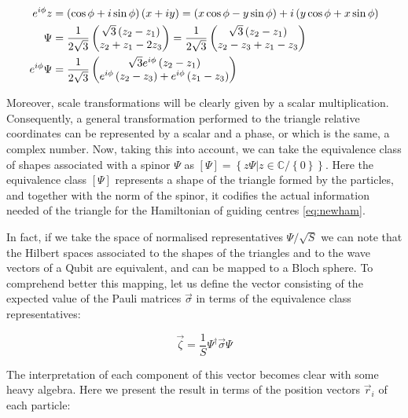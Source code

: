 \begin{align*}
e^{i\phi}z &= \left( \cos{\phi}+i\sin{\phi} \right)\left( x+iy \right) = \left( x\cos{\phi}-y\sin{\phi} \right) + i\left( y\cos{\phi}+x\sin{\phi} \right)\\
\Psi &= \frac{1}{2\sqrt{3}}\begin{pmatrix}\sqrt{3}\left( z_{2}-z_{1} \right)\\
z_{2}+z_{1}-2z_{3}\end{pmatrix}=\frac{1}{2\sqrt{3}}\begin{pmatrix}\sqrt{3}\left( z_{2}-z_{1} \right)\\
z_{2}-z_3+ z_{1}-z_{3}\end{pmatrix}\\
e^{i\phi}\Psi &= \frac{1}{2\sqrt{3}}\begin{pmatrix}\sqrt{3}e^{i\phi}\left( z_{2}-z_{1} \right)\\
e^{i\phi}\left( z_{2}-z_3 \right)+ e^{i\phi}\left( z_{1}-z_{3} \right)\end{pmatrix}
\end{align*}

Moreover, scale transformations will be clearly given by a scalar multiplication. Consequently, a general transformation performed to the triangle relative coordinates can be represented by a scalar and a phase, or which is the same, a complex number. Now, taking this into account, we can take the equivalence class of shapes associated with a spinor $\Psi$ as $\left[ \Psi \right] = \left\{ z\Psi | z \in \mathbb{C} / \left\{ 0 \right\} \right\}$. Here the equivalence class $\left[ \Psi \right]$ represents a shape of the triangle formed by the particles, and together with the norm of the spinor, it codifies the actual information needed of the triangle for the Hamiltonian of guiding centres \eqref{eq:newham}. 

In fact, if we take the space of normalised representatives $\Psi/\sqrt{S}$ we can note that the Hilbert spaces associated to the shapes of the triangles and to the wave vectors of a Qubit are equivalent, and can be mapped to a Bloch sphere. To comprehend better this mapping, let us define the vector consisting of the expected value of the Pauli matrices $\vec{\sigma}$ in terms of the equivalence class representatives:

\begin{equation}
\vec{\zeta} = \frac{1}{S} \Psi^{\dagger}\vec{\sigma}\Psi
\end{equation}

The interpretation of each component of this vector becomes clear with some heavy algebra. Here we present the result in terms of the position vectors $ \vec{r}_i $ of each particle:

